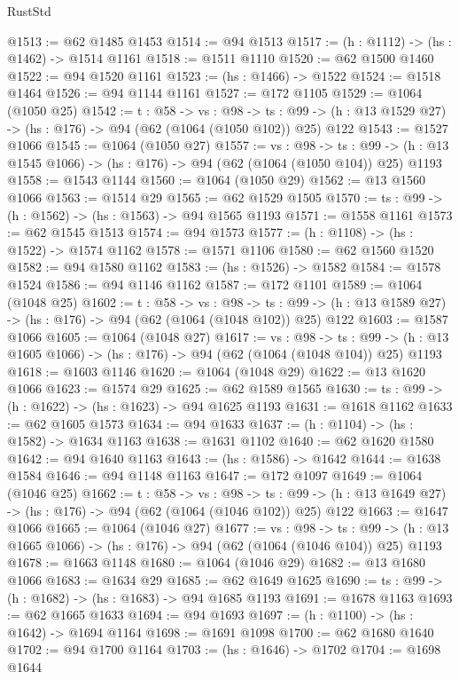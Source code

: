 \begin{lexlean}{RustStd}
\begin{coremodule}
{\begin{coremodule}
{{{{{{{{{{{@1513 := @62 @1485 @1453
@1514 := @94 @1513
@1517 := (h : @1112) -> (hs : @1462) -> @1514 @1161
@1518 := @1511 @1110
@1520 := @62 @1500 @1460
@1522 := @94 @1520 @1161
@1523 := (hs : @1466) -> @1522
@1524 := @1518 @1464
@1526 := @94 @1144 @1161
@1527 := @172 @1105
@1529 := @1064 (@1050 @25)
@1542 := {t : @58} ->
  {vs : @98} ->
  {ts : @99} -> (h : @13 @1529 @27) -> (hs : @176) -> @94 (@62 (@1064 (@1050 @102)) @25) @122
@1543 := @1527 @1066
@1545 := @1064 (@1050 @27)
@1557 := {vs : @98} ->
  {ts : @99} -> (h : @13 @1545 @1066) -> (hs : @176) -> @94 (@62 (@1064 (@1050 @104)) @25) @1193
@1558 := @1543 @1144
@1560 := @1064 (@1050 @29)
@1562 := @13 @1560 @1066
@1563 := @1514 @29
@1565 := @62 @1529 @1505
@1570 := {ts : @99} -> (h : @1562) -> (hs : @1563) -> @94 @1565 @1193
@1571 := @1558 @1161
@1573 := @62 @1545 @1513
@1574 := @94 @1573
@1577 := (h : @1108) -> (hs : @1522) -> @1574 @1162
@1578 := @1571 @1106
@1580 := @62 @1560 @1520
@1582 := @94 @1580 @1162
@1583 := (hs : @1526) -> @1582
@1584 := @1578 @1524
@1586 := @94 @1146 @1162
@1587 := @172 @1101
@1589 := @1064 (@1048 @25)
@1602 := {t : @58} ->
  {vs : @98} ->
  {ts : @99} -> (h : @13 @1589 @27) -> (hs : @176) -> @94 (@62 (@1064 (@1048 @102)) @25) @122
@1603 := @1587 @1066
@1605 := @1064 (@1048 @27)
@1617 := {vs : @98} ->
  {ts : @99} -> (h : @13 @1605 @1066) -> (hs : @176) -> @94 (@62 (@1064 (@1048 @104)) @25) @1193
@1618 := @1603 @1146
@1620 := @1064 (@1048 @29)
@1622 := @13 @1620 @1066
@1623 := @1574 @29
@1625 := @62 @1589 @1565
@1630 := {ts : @99} -> (h : @1622) -> (hs : @1623) -> @94 @1625 @1193
@1631 := @1618 @1162
@1633 := @62 @1605 @1573
@1634 := @94 @1633
@1637 := (h : @1104) -> (hs : @1582) -> @1634 @1163
@1638 := @1631 @1102
@1640 := @62 @1620 @1580
@1642 := @94 @1640 @1163
@1643 := (hs : @1586) -> @1642
@1644 := @1638 @1584
@1646 := @94 @1148 @1163
@1647 := @172 @1097
@1649 := @1064 (@1046 @25)
@1662 := {t : @58} ->
  {vs : @98} ->
  {ts : @99} -> (h : @13 @1649 @27) -> (hs : @176) -> @94 (@62 (@1064 (@1046 @102)) @25) @122
@1663 := @1647 @1066
@1665 := @1064 (@1046 @27)
@1677 := {vs : @98} ->
  {ts : @99} -> (h : @13 @1665 @1066) -> (hs : @176) -> @94 (@62 (@1064 (@1046 @104)) @25) @1193
@1678 := @1663 @1148
@1680 := @1064 (@1046 @29)
@1682 := @13 @1680 @1066
@1683 := @1634 @29
@1685 := @62 @1649 @1625
@1690 := {ts : @99} -> (h : @1682) -> (hs : @1683) -> @94 @1685 @1193
@1691 := @1678 @1163
@1693 := @62 @1665 @1633
@1694 := @94 @1693
@1697 := (h : @1100) -> (hs : @1642) -> @1694 @1164
@1698 := @1691 @1098
@1700 := @62 @1680 @1640
@1702 := @94 @1700 @1164
@1703 := (hs : @1646) -> @1702
@1704 := @1698 @1644
}}}}}}}}}}}
\end{coremodule}}
\end{coremodule}
\end{lexlean}
